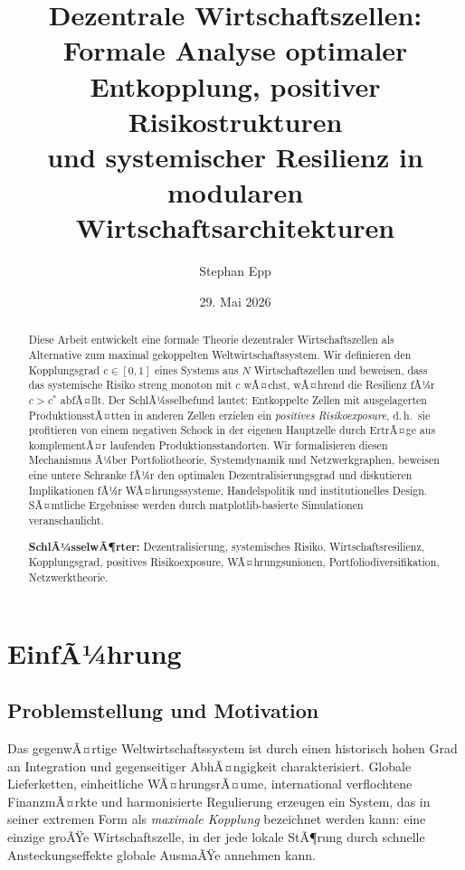 ﻿\documentclass[a4paper,12pt]{article}
\title{\textbf{Dezentrale Wirtschaftszellen:}\\
\large Formale Analyse optimaler Entkopplung, positiver Risikostrukturen\\
und systemischer Resilienz in modularen Wirtschaftsarchitekturen}
\author{Stephan Epp}
\date{29. Mai 2026}
\theoremstyle{definition}
\begin{document}
\maketitle

\begin{abstract}
Diese Arbeit entwickelt eine formale Theorie dezentraler Wirtschaftszellen als Alternative zum
maximal gekoppelten Weltwirtschaftssystem. Wir definieren den Kopplungsgrad $c \in [0,1]$ eines
Systems aus $N$ Wirtschaftszellen und beweisen, dass das systemische Risiko streng monoton mit $c$
wÃ¤chst, wÃ¤hrend die Resilienz fÃ¼r $c > c^*$ abfÃ¤llt. Der SchlÃ¼sselbefund lautet: Entkoppelte Zellen
mit ausgelagerten ProduktionsstÃ¤tten in anderen Zellen erzielen ein \emph{positives Risikoexposure},
d.\,h.\ sie profitieren von einem negativen Schock in der eigenen Hauptzelle durch ErtrÃ¤ge aus
komplementÃ¤r laufenden Produktionsstandorten. Wir formalisieren diesen Mechanismus Ã¼ber
Portfoliotheorie, Systemdynamik und Netzwerkgraphen, beweisen eine untere Schranke fÃ¼r den
optimalen Dezentralisierungsgrad und diskutieren Implikationen fÃ¼r WÃ¤hrungssysteme, Handelspolitik
und institutionelles Design. SÃ¤mtliche Ergebnisse werden durch matplotlib-basierte Simulationen
veranschaulicht.

\medskip
\noindent\textbf{SchlÃ¼sselwÃ¶rter:} Dezentralisierung, systemisches Risiko, Wirtschaftsresilienz,
Kopplungsgrad, positives Risikoexposure, WÃ¤hrungsunionen, Portfoliodiversifikation, Netzwerktheorie.
\end{abstract}

\tableofcontents
\newpage

\section{EinfÃ¼hrung}

\subsection{Problemstellung und Motivation}

Das gegenwÃ¤rtige Weltwirtschaftssystem ist durch einen historisch hohen Grad an Integration und
gegenseitiger AbhÃ¤ngigkeit charakterisiert. Globale Lieferketten, einheitliche WÃ¤hrungsrÃ¤ume,
international verflochtene FinanzmÃ¤rkte und harmonisierte Regulierung erzeugen ein System, das in
seiner extremen Form als \emph{maximale Kopplung} bezeichnet werden kann: eine einzige groÃŸe
Wirtschaftszelle, in der jede lokale StÃ¶rung durch schnelle Ansteckungseffekte globale AusmaÃŸe
annehmen kann.
\end{document}
